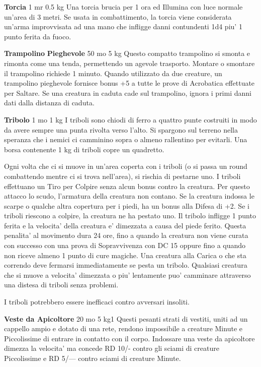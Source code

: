 \documentclass[a4paper,11pt,twoside,openany]{dndbook}
\begin{document}
{\textbf{Torcia} 1 mr 0.5 kg Una torcia brucia per 1 ora ed Illumina con luce normale un'area di 3 metri. Se usata in combattimento, la torcia viene considerata un'arma improvvisata ad una mano che infligge danni contundenti 1d4 piu' 1 punto ferita da fuoco. 

\textbf{Trampolino} \textbf{Pieghevole} 50 mo 5 kg Questo compatto trampolino si smonta e rimonta come una tenda, permettendo un agevole trasporto. Montare o smontare il trampolino richiede 1 minuto. Quando utilizzato da due creature, un trampolino pieghevole fornisce bonus +5 a tutte le prove di Acrobatica effettuate per Saltare. Se una creatura in caduta cade sul trampolino, ignora i primi danni dati dalla distanza di caduta.

\textbf{Tribolo} 1 mo 1 kg I triboli sono chiodi di ferro a quattro punte costruiti in modo da avere sempre una punta rivolta verso l'alto. Si spargono sul terreno nella speranza che i nemici ci camminino sopra o almeno rallentino per evitarli. Una borsa contenente 1 kg di triboli copre un quadretto.

Ogni volta che ci si muove in un'area coperta con i triboli (o si passa un round combattendo mentre ci si trova nell'area), si rischia di pestarne uno. I triboli effettuano un Tiro per Colpire senza alcun bonus contro la creatura. Per questo attacco lo scudo, l'armatura della creatura non contano. Se la creatura indossa le scarpe o qualche altra copertura per i piedi, ha un bonus alla Difesa di +2. Se i triboli riescono a colpire, la creatura ne ha pestato uno. Il tribolo infligge 1 punto ferita e la velocita' della creatura e' dimezzata a causa del piede ferito. Questa penalita' al movimento dura 24 ore, fino a quando la creatura non viene curata con successo con una prova di Sopravvivenza con DC 15 oppure fino a quando non riceve almeno 1 punto di cure magiche.
Una creatura alla Carica o che sta correndo deve fermarsi immediatamente se pesta un tribolo. Qualsiasi creatura che si muove a velocita' dimezzata o piu' lentamente puo' camminare attraverso una distesa di triboli senza problemi.

I triboli potrebbero essere inefficaci contro avversari insoliti.

\textbf{Veste da Apicoltore} 20 mo 5 kg1 Questi pesanti strati di vestiti, uniti ad un cappello ampio e dotato di una rete, rendono impossibile a creature Minute e Piccolissime di entrare in contatto con il corpo. Indossare una veste da apicoltore dimezza la velocita' ma concede RD 10/- contro gli sciami di creature Piccolissime e RD 5/--- contro sciami di creature Minute.

}
\end{document}
